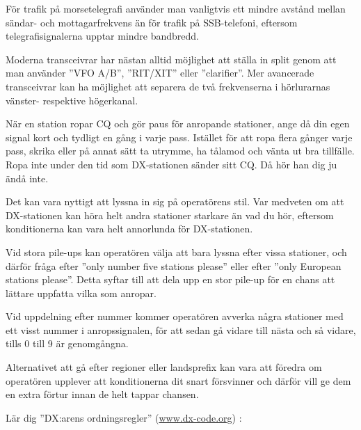 För trafik på morsetelegrafi använder man vanligtvis ett mindre avstånd mellan sändar- och mottagarfrekvens än för trafik på SSB-telefoni, eftersom telegrafisignalerna upptar mindre bandbredd.

Moderna transceivrar har nästan alltid möjlighet att ställa in split genom att
man använder ''VFO A/B'', ''RIT/XIT'' eller ''clarifier''.
Mer avancerade transceivrar kan ha möjlighet att separera de två frekvenserna i
hörlurarnas vänster- respektive högerkanal.

När en station ropar CQ och gör paus för anropande stationer, ange då din egen
signal kort och tydligt en gång i varje pass.
Istället för att ropa flera gånger varje pass, skrika eller på annat sätt
ta utrymme, ha tålamod och vänta ut bra tillfälle.
Ropa inte under den tid som DX-stationen sänder sitt CQ. Då hör han dig ju ändå inte.

Det kan vara nyttigt att lyssna in sig på operatörens stil.
Var medveten om att DX-stationen kan höra helt andra stationer starkare än vad du hör,
eftersom konditionerna kan vara helt annorlunda för DX-stationen.

Vid stora pile-ups kan operatören välja att bara lyssna efter vissa stationer,
och därför fråga efter ''only number five stations please'' eller efter ''only European stations please''. Detta syftar till att dela upp en stor pile-up för en chans att lättare uppfatta vilka som anropar.

Vid uppdelning efter nummer kommer operatören avverka några stationer med ett visst nummer i anropssignalen, för att sedan gå vidare till nästa och så vidare, tills 0 till 9 är genomgångna.

Alternativet att gå efter regioner eller landsprefix kan vara att föredra om operatören upplever att konditionerna dit snart försvinner och därför vill ge dem en extra förtur innan de helt tappar chansen.

Lär dig ''DX:arens ordningsregler'' (\href{http://www.dx-code.org/}{www.dx-code.org}) :

